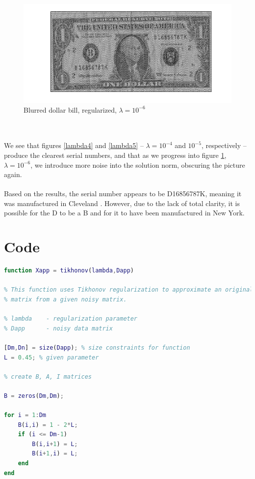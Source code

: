 \documentclass[12pt]{article}
\begin{document}
\begin{flushleft}
\begin{figure}[H]
	\centering
	\captionsetup{justification=centering}
	\includegraphics[scale=0.55]{images/lambda0000001.png}
	\caption{Blurred dollar bill, regularized, $\lambda = 10^{-6}$}
	\label{lambda6}
\end{figure}
\ \\
\ \\
We see that figures \ref{lambda4} and \ref{lambda5} -- $\lambda = 10^{-4}$ and $10^{-5}$, respectively -- produce the clearest serial numbers, and that as we progress into figure \ref{lambda6}, $\lambda = 10^{-6}$, we introduce more noise into the solution norm, obscuring the picture again.
\ \\
\ \\
Based on the results, the serial number appears to be D16856787K, meaning it was manufactured in Cleveland \cite{serial}. However, due to the lack of total clarity, it is possible for the D to be a B and for it to have been manufactured in New York.

\section{Code} \label{code}

\begin{lstlisting}[language=Matlab]
function Xapp = tikhonov(lambda,Dapp)

% This function uses Tikhonov regularization to approximate an original
% matrix from a given noisy matrix.

% lambda    - regularization parameter    
% Dapp      - noisy data matrix

[Dm,Dn] = size(Dapp); % size constraints for function
L = 0.45; % given parameter

% create B, A, I matrices

B = zeros(Dm,Dm);

for i = 1:Dm
    B(i,i) = 1 - 2*L;
    if (i <= Dm-1)
        B(i,i+1) = L;
        B(i+1,i) = L;
    end
end


\end{lstlisting}
\end{flushleft}
\end{document}
